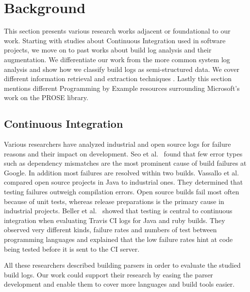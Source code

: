 \documentclass[\myrootdir/main.tex]{subfiles}
\begin{document}
\chapter{Background}
\label{sec:rw}
This section presents various research works adjacent or foundational to our work.
Starting with studies about Continuous Integration used in software projects, we move on to past works about build log analysis and their augmentation.
We differentiate our work from the more common system log analysis and show how we classify build logs as semi-structured data.
We cover different information retrieval and extraction techniques .
Lastly this section mentions different Programming by Example resources surrounding Microsoft's work on the PROSE library.

\section{Continuous Integration}
Various researchers have analyzed industrial and open source logs for failure reasons and their impact on development. Seo et al.~\cite{seo2014programmers} found that few error types such as dependency mismatches are the most prominent cause of build failures at Google. In addition most failures are resolved within two builds. Vassallo et al.~\cite{vassallo2017a-tale} compared open source projects in Java to industrial ones. They determined that testing failures outweigh compilation errors. Open source builds fail most often because of unit tests, whereas release preparations is the primary cause in industrial projects. Beller et al.~\cite{beller2017oops} showed that testing is central to continuous integration when evaluating Travis CI logs for Java and ruby builds. They observed very different kinds, failure rates and numbers of test between programming languages and explained that the low failure rates hint at code being tested before it is sent to the CI server.

All these researchers described building parsers in order to evaluate the studied build logs. Our work could support their research by easing the parser development and enable them to cover more languages and build tools easier.
\end{document}
